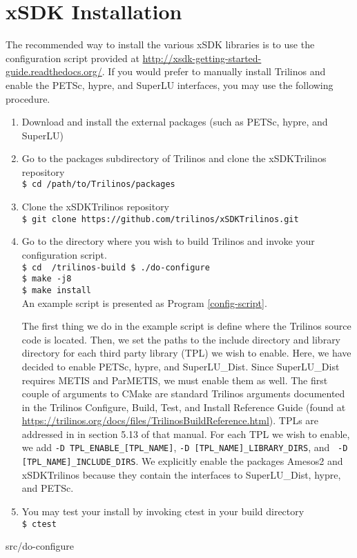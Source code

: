 \chapter{xSDK Installation}
The recommended way to install the various xSDK libraries is to use the
configuration script provided at
\url{http://xsdk-getting-started-guide.readthedocs.org/}.  
If you would prefer to manually install Trilinos and enable the PETSc, hypre,
and SuperLU interfaces, you may use the following procedure.

\begin{enumerate}
  \item Download and install the external packages (such as PETSc, hypre, and
  SuperLU)
  \item Go to the packages subdirectory of Trilinos and clone the xSDKTrilinos
        repository \\
        {\tt \$ cd /path/to/Trilinos/packages}
  \item Clone the xSDKTrilinos repository \\
        {\tt \$ git clone https://github.com/trilinos/xSDKTrilinos.git}
  \item Go to the directory where you wish to build Trilinos and invoke your
        configuration script. \\
        {\tt \$ cd ~/trilinos-build
             \$ ./do-configure \\
             \$ make -j8 \\
             \$ make install \\}
        An example script is presented as Program \ref{config-script}.
        
        The first thing we do in the example script is
        define where the Trilinos source code is located.  Then, we set the
        paths to the include directory and library directory for each third
        party library (TPL) we wish to enable.  Here, we have decided to enable
        PETSc, hypre, and SuperLU\_Dist.  Since SuperLU\_Dist requires METIS and
        ParMETIS, we must enable them as well.  The first couple of arguments
        to CMake are standard Trilinos arguments documented in the Trilinos
        Configure, Build, Test, and Install Reference Guide (found at
        \url{https://trilinos.org/docs/files/TrilinosBuildReference.html}).
        TPLs are addressed in in section 5.13 of that manual. 
        For each TPL we wish to enable, we add {\tt -D 
        TPL\_ENABLE\_[TPL\_NAME]}, {\tt -D [TPL\_NAME]\_LIBRARY\_DIRS}, and {\tt
        -D [TPL\_NAME]\_INCLUDE\_DIRS}.  We explicitly enable the packages
        Amesos2 and xSDKTrilinos because they contain the interfaces to
        SuperLU\_Dist, hypre, and PETSc.
  \item You may test your install by invoking ctest in your build directory \\
        {\tt \$ ctest}
\end{enumerate}

\begin{lstinputlisting}[caption=Sample
configuration script,label=config-script]{src/do-configure}
\end{lstinputlisting}
